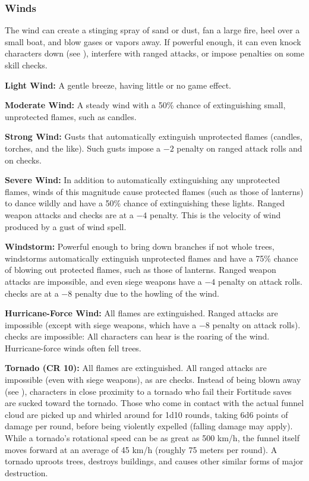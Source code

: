 \subsubsection{Winds}
The wind can create a stinging spray of sand or dust, fan a large fire, heel over a small boat, and blow gases or vapors away. If powerful enough, it can even knock characters down (see ), interfere with ranged attacks, or impose penalties on some skill checks.

\textbf{Light Wind:} A gentle breeze, having little or no game effect.

\textbf{Moderate Wind:} A steady wind with a 50\% chance of extinguishing small, unprotected flames, such as candles.

\textbf{Strong Wind:} Gusts that automatically extinguish unprotected flames (candles, torches, and the like). Such gusts impose a $-2$ penalty on ranged attack rolls and on  checks.

\textbf{Severe Wind:} In addition to automatically extinguishing any unprotected flames, winds of this magnitude cause protected flames (such as those of lanterns) to dance wildly and have a 50\% chance of extinguishing these lights. Ranged weapon attacks and  checks are at a $-4$ penalty. This is the velocity of wind produced by a gust of wind spell.

\textbf{Windstorm:} Powerful enough to bring down branches if not whole trees, windstorms automatically extinguish unprotected flames and have a 75\% chance of blowing out protected flames, such as those of lanterns. Ranged weapon attacks are impossible, and even siege weapons have a $-4$ penalty on attack rolls.  checks are at a $-8$ penalty due to the howling of the wind.

\textbf{Hurricane-Force Wind:} All flames are extinguished. Ranged attacks are impossible (except with siege weapons, which have a $-8$ penalty on attack rolls).  checks are impossible: All characters can hear is the roaring of the wind. Hurricane-force winds often fell trees.

\textbf{Tornado (CR 10):} All flames are extinguished. All ranged attacks are impossible (even with siege weapons), as are  checks. Instead of being blown away (see ), characters in close proximity to a tornado who fail their Fortitude saves are sucked toward the tornado. Those who come in contact with the actual funnel cloud are picked up and whirled around for 1d10 rounds, taking 6d6 points of damage per round, before being violently expelled (falling damage may apply). While a tornado's rotational speed can be as great as 500 km/h, the funnel itself moves forward at an average of 45 km/h (roughly 75 meters per round). A tornado uproots trees, destroys buildings, and causes other similar forms of major destruction.